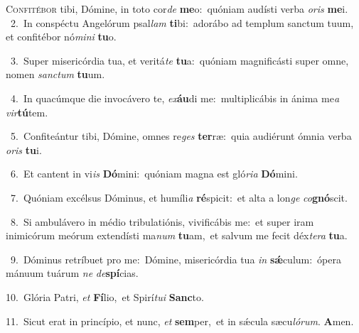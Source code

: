 \lettrine{\initial\textcolor{\initialcolor}{C}}{onfitébor} tibi, Dómine, in toto cor\textit{de} \textbf{me}\-o:~\star quóniam audísti verba \textit{o}\-\textit{ris} \textbf{me}\-i.\\
{\numbfont\textcolor{\numbcolor}{~2.}}~In conspéctu Angelórum psal\textit{lam} \textbf{ti}\-bi:~\star adorábo ad templum sanctum tuum, et confitébor nó\-\textit{mi}\-\textit{ni} \textbf{tu}\-o.\par
{\numbfont\textcolor{\numbcolor}{~3.}}~Super misericórdia tua, et veritá\textit{te} \textbf{tu}\-a:~\star quóniam magnificásti super omne, nomen \textit{sanc}\-\textit{tum} \textbf{tu}\-um.\par
{\numbfont\textcolor{\numbcolor}{~4.}}~In quacúmque die invocávero te, \textit{ex}\-\textbf{áu}di me:~\star multiplicábis in ánima me\textit{a} \textit{vir}\-\textbf{tú}tem.\par
{\numbfont\textcolor{\numbcolor}{~5.}}~Confiteántur tibi, Dómine, omnes re\textit{ges} \textbf{ter}\-ræ:~\star quia audiérunt ómnia verba \textit{o}\-\textit{ris} \textbf{tu}\-i.\par
{\numbfont\textcolor{\numbcolor}{~6.}}~Et cantent in vi\textit{is} \textbf{Dó}\-mini:~\star quóniam magna est gló\-\textit{ri}\-\textit{a} \textbf{Dó}\-mini.\par
{\numbfont\textcolor{\numbcolor}{~7.}}~Quóniam excélsus Dóminus, et humíli\textit{a} \textbf{ré}\-spicit:~\star et alta a lon\textit{ge} \textit{co}\-\textbf{gnó}scit.\par
{\numbfont\textcolor{\numbcolor}{~8.}}~Si ambulávero in médio tribulatiónis, vivificábis me:~\dagger et super iram inimicórum meórum extendísti ma\textit{num} \textbf{tu}\-am,~\star et salvum me fecit déx\-\textit{te}\-\textit{ra} \textbf{tu}\-a.\par
{\numbfont\textcolor{\numbcolor}{~9.}}~Dóminus retríbuet pro me:~\dagger Dómine, misericórdia tua \textit{in} \textbf{sǽ}\-culum:~\star ópera mánuum tuárum \textit{ne} \textit{de}\-\textbf{spí}cias.\par
{\numbfont\textcolor{\numbcolor}{10.}}~Glória Patri, \textit{et} \textbf{Fí}\-lio,~\star et Spirí\-\textit{tu}\-\textit{i} \textbf{Sanc}\-to.\par
{\numbfont\textcolor{\numbcolor}{11.}}~Sicut erat in princípio, et nunc, \textit{et} \textbf{sem}\-per,~\star et in sǽcula sæcu\-\textit{ló}\-\textit{rum}. \textbf{A}\-men.\par
